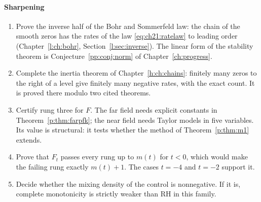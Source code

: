 \paragraph{Sharpening}
\begin{enumerate}
\item Prove the inverse half of the Bohr and Sommerfeld law: the chain of the smooth zeros has the rates of the law \eqref{eq:ch21:ratelaw} to leading order (Chapter~\ref{l:ch:bohr}, Section~\ref{l:sec:inverse}). The linear form of the stability theorem is Conjecture~\ref{pp:conj:norm} of Chapter~\ref{ch:progress}.
\item Complete the inertia theorem of Chapter~\ref{h:ch:chains}: finitely many zeros to the right of a level give finitely many negative rates, with the exact count. It is proved there modulo two cited theorems.
\item Certify rung three for $F$. The far field needs explicit constants in Theorem~\ref{p:thm:farpfk}; the near field needs Taylor models in five variables. Its value is structural: it tests whether the method of Theorem~\ref{p:thm:m1} extends.
\item Prove that $F_t$ passes every rung up to $m(t)$ for $t<0$, which would make the failing rung exactly $m(t)+1$. The cases $t=-4$ and $t=-2$ support it.
\item Decide whether the mixing density of the control is nonnegative. If it is, complete monotonicity is strictly weaker than RH in this family.
\end{enumerate}

